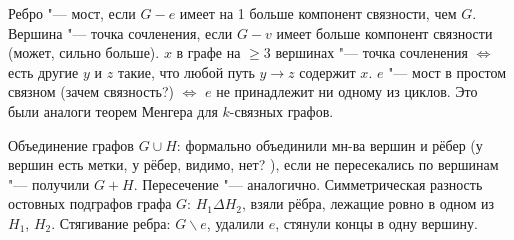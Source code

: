 Ребро "--- мост, если $G-e$ имеет на 1 больше компонент связности, чем $G$.
Вершина "--- точка сочленения, если $G-v$ имеет больше компонент связности (может, сильно больше).
$x$ в графе на $\ge 3$ вершинах "--- точка сочленения $\iff$ есть другие $y$ и $z$ такие, что любой путь $y\to z$ содержит $x$.
$e$ "--- мост в простом связном (\TODO зачем связность?) $\iff$ $e$ не принадлежит ни одному из циклов.
Это были аналоги теорем Менгера для $k$-связных графов.

Объединение графов $G\cup H$: формально объединили мн-ва вершин и рёбер (у вершин есть метки, у рёбер, видимо, нет? \TODO), если не пересекались по вершинам "--- получили $G+H$.
Пересечение "--- аналогично.
Симметрическая разность остовных подграфов графа $G$: $H_1 \Delta H_2$, взяли рёбра, лежащие ровно в одном из $H_1$, $H_2$.
Стягивание ребра: $G \backslash e$, удалили $e$, стянули концы в одну вершину.

\section{} %
